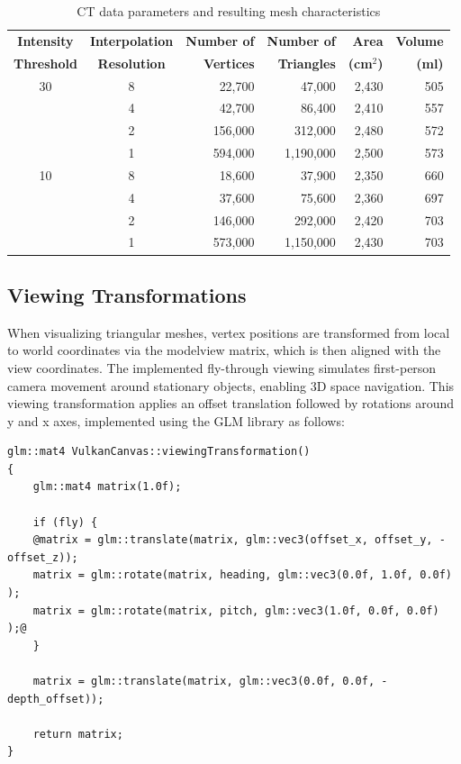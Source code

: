 \documentclass[11pt, twocolumn]{article}
\begin{document}
\begin{table}[ht]
    \caption{CT data parameters and resulting mesh characteristics}
    \label{tab:ct-data}
    \begin{tabular*}{\textwidth}{@{\extracolsep{\fill}}ccrrrr@{}}
    \hline
    \textbf{Intensity} & \textbf{Interpolation} & \textbf{Number of} & \textbf{Number of} & \textbf{Area} & \textbf{Volume} \\
    \textbf{Threshold} & \textbf{Resolution} & \textbf{Vertices} & \textbf{Triangles} & \textbf{(cm$^2$)} & \textbf{(ml)} \\
    \hline
    30 & 8 & 22,700 & 47,000 & 2,430 & 505 \\
     & 4 & 42,700 & 86,400 & 2,410 & 557 \\
     & 2 & 156,000 & 312,000 & 2,480 & 572 \\
     & 1 & 594,000 & 1,190,000 & 2,500 & 573 \\
    \hline
    10 & 8 & 18,600 & 37,900 & 2,350 & 660 \\
     & 4 & 37,600 & 75,600 & 2,360 & 697 \\
     & 2 & 146,000 & 292,000 & 2,420 & 703 \\
     & 1 & 573,000 & 1,150,000 & 2,430 & 703 \\
    \hline
    \end{tabular*}
\end{table}

\subsection{Viewing Transformations}
When visualizing triangular meshes, vertex positions are transformed from local to world coordinates via the modelview matrix, which is then aligned with the view coordinates. The implemented fly-through viewing simulates first-person camera movement around stationary objects, enabling 3D space navigation. This viewing transformation applies an offset translation followed by rotations around y and x axes, implemented using the GLM library as follows:
\begin{lstlisting}[basicstyle=\ttfamily\scriptsize, style=custom, frame=single, caption={\textit{y-z} Reslice Nearest Neighbour}, label={lst:yz_reslice}]
glm::mat4 VulkanCanvas::viewingTransformation()
{
    glm::mat4 matrix(1.0f);

    if (fly) {
    @matrix = glm::translate(matrix, glm::vec3(offset_x, offset_y, -offset_z));
    matrix = glm::rotate(matrix, heading, glm::vec3(0.0f, 1.0f, 0.0f) );
    matrix = glm::rotate(matrix, pitch, glm::vec3(1.0f, 0.0f, 0.0f) );@
    }

    matrix = glm::translate(matrix, glm::vec3(0.0f, 0.0f, -depth_offset));

    return matrix;
}
\end{lstlisting}
\end{document}
